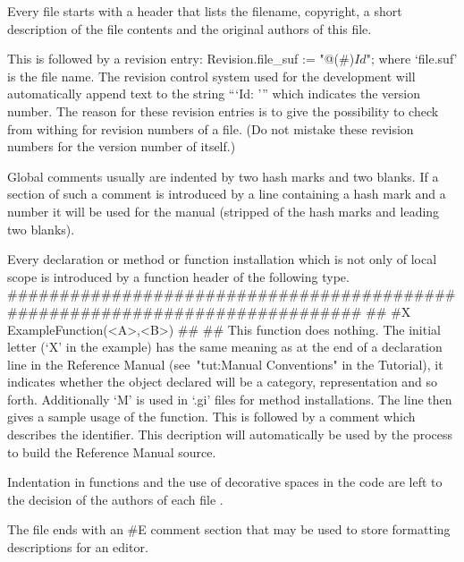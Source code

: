 
Every file starts with a header that lists the filename, copyright, a short
description of the file contents and the original authors of this file.

This is followed by a revision entry:
\begintt
Revision.file_suf :=
    "@(#)$Id$";
\endtt
where `file.suf' is the file name. The revision control system used for the
development will automatically append text to the string ``{`Id: '}'' which
indicates the version number. The reason for these revision entries is to
give the possibility to check from withing {\GAP} for revision numbers of a
file. (Do not mistake these revision numbers for the version number of
{\GAP} itself.)

Global comments usually are indented by two hash marks and two blanks.
If a section of such a comment is introduced by a line containing
a hash mark and a number it will be used for the manual
(stripped of the hash marks and leading two blanks).

Every declaration or method or function installation which is not only of
local scope is introduced by a function header of the following type.
\begintt
#############################################################################
##
#X  ExampleFunction(<A>,<B>)
##
##  This function does nothing.
\endtt
The initial letter (`X' in the example) has the same meaning as at the end
of a declaration line in the Reference Manual (see~"tut:Manual Conventions"
in the Tutorial),
it indicates whether the object declared will be a category, representation
and so forth.
Additionally `M' is used in `.gi' files for method installations.
The line then gives a sample usage of the function.
This is followed by a comment which describes the identifier.
This decription will automatically be used by the process to build the
Reference Manual source.

Indentation in functions and the use of decorative spaces in the code are
left to the decision of the authors of each file .

The file ends with an 
\begintt
#E
\endtt
comment section that may be used to store formatting descriptions for an
editor.



